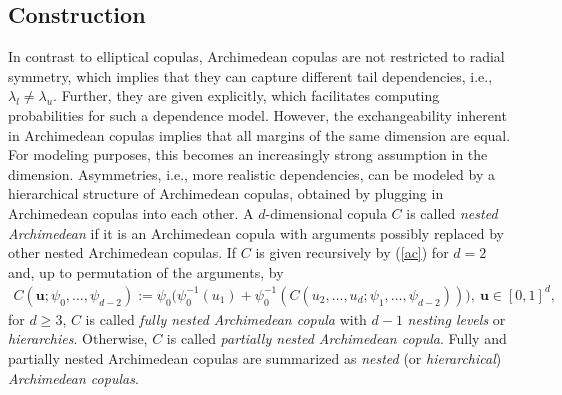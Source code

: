 \documentclass[nojss,article]{jss}
\theoremstyle{mythmstyle}
\newcommand*{\psiis}[1]{{\psi_{#1}^{-1}}}
\begin{document}
\subsection{Construction}
In contrast to elliptical copulas, Archimedean copulas are not restricted to
radial symmetry, which implies that they can capture different tail
dependencies, i.e., $\lambda_l\neq\lambda_u$. Further, they are given
explicitly, which facilitates computing probabilities for such a dependence
model. However, the exchangeability inherent in Archimedean copulas implies that
all margins of the same dimension are equal. For modeling purposes, this
becomes an increasingly strong assumption in the dimension. Asymmetries, i.e.,
more realistic dependencies, can be modeled by a hierarchical structure of
Archimedean copulas, obtained by plugging in Archimedean copulas into each
other. A $d$-dimensional copula $C$ is called \textit{nested Archimedean} if it
is an Archimedean copula with arguments possibly replaced by other nested
Archimedean copulas. If $C$ is given recursively by (\ref{ac}) for $d=2$ and,
up to permutation of the arguments, by
\begin{align}
  C(\bm{u};\psi_0,\dots,\psi_{d-2}) := \psi_0\bigl(\psiis{0}(u_1)+
  \psiis{0}(C(u_2,\dots,u_d;\psi_{1},\dots,\psi_{d-2}))\bigr),
  \ \bm{u}\in[0,1]^d,\label{nac}
\end{align}
for $d\ge3$, $C$ is called \textit{fully nested Archimedean copula} with
$d-1$ \textit{nesting levels} or \textit{hierarchies}. Otherwise, $C$ is
called \textit{partially nested Archimedean copula}. Fully and partially
nested Archimedean copulas are summarized as \textit{nested} (or
\textit{hierarchical}) \textit{Archimedean copulas}.
\end{document}
